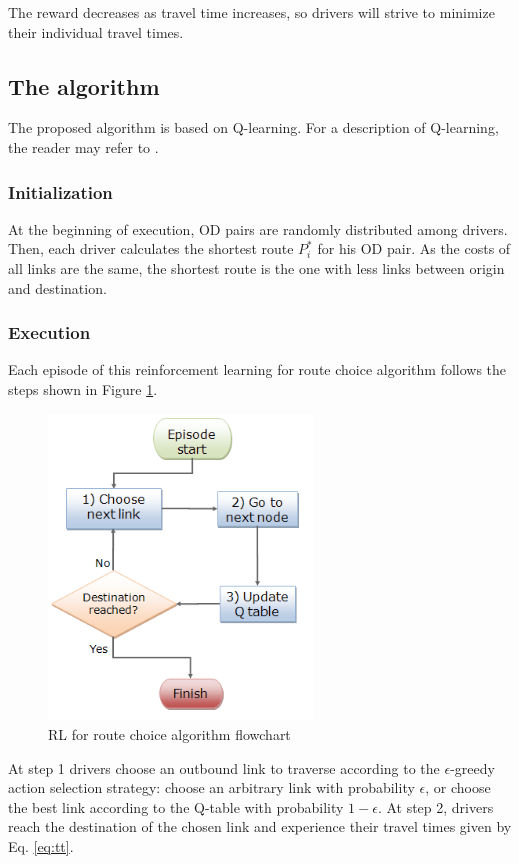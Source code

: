 \documentclass[12pt]{article}
\begin{document}
The reward decreases as travel time increases, so drivers will strive to minimize their individual travel times.

\subsection{The algorithm}

The proposed algorithm is based on Q-learning. For a description of Q-learning, the reader may refer to \cite{Watkins&Dayan1992}. 

\subsubsection{Initialization}
At the beginning of execution, OD pairs are randomly distributed among drivers. Then, each driver calculates the shortest route $P_i^*$ for his OD pair. As the costs of all links are the same, the shortest route is the one with less links between origin and destination. 

\subsubsection{Execution}

Each episode of this reinforcement learning for route choice algorithm follows the steps shown in Figure \ref{fig:flowchart}.

\begin{figure}[ht]
    \centerline{\includegraphics[width=7cm]{img/flowchart2.png}}
    \caption{RL for route choice algorithm flowchart}
    \label{fig:flowchart}
\end{figure}

At step 1 drivers choose an outbound link to traverse according to the $\epsilon$-greedy action selection strategy: choose an arbitrary link with probability $\epsilon$, or choose the best link according to the Q-table with probability $1-\epsilon$. At step 2, drivers reach the destination of the chosen link and experience their travel times given by Eq. \eqref{eq:tt}.
\end{document}
